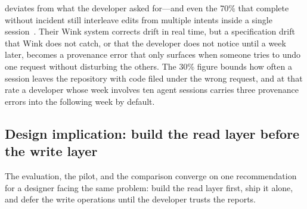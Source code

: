 deviates from what the developer asked for---and even the 70\% that complete
without incident still interleave edits from multiple intents inside a single
session~\cite{nanda2026wink}. Their Wink system corrects drift in real time, but a
specification drift that Wink does not catch, or that the developer does not notice
until a week later, becomes a provenance error that only surfaces when someone
tries to undo one request without disturbing the others. The 30\% figure bounds
how often a session leaves the repository with code filed under the wrong request,
and at that rate a developer whose week involves ten agent sessions carries three
provenance errors into the following week by default.

\subsection{Design implication: build the read layer before the write layer}

The evaluation, the pilot, and the comparison converge on one recommendation for
a designer facing the same problem: build the read layer first, ship it alone,
and defer the write operations until the developer trusts the reports.

